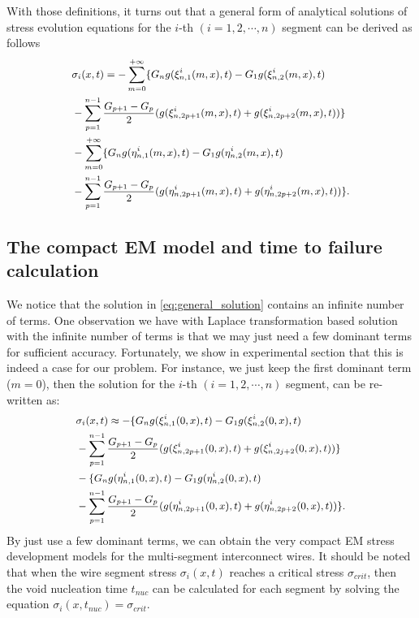 With those definitions, it turns out that a general form of analytical
solutions of stress evolution equations for the $i$-th
$(i=1,2,\cdots,n)$ segment can be derived as follows
\begin{equation} \label{eq:general_solution}\small
\begin{split}
&\sigma_{i}(x,t)=-\sum\limits_{m=0}^{+\infty}\{G_ng(\xi_{n,1}^{i}(m,x),t)-G_1g(\xi_{n,2}^{i}(m,x),t)\\
&-\sum\limits_{p=1}^{n-1}\frac{G_{p+1}-G_p}{2}(g(\xi_{n,2p+1}^{i}(m,x),t)+g(\xi_{n,2p+2}^{i}(m,x),t))\}\\
&-\sum\limits_{m=0}^{+\infty}\{G_ng(\eta_{n,1}^{i}(m,x),t)-G_1g(\eta_{n,2}^{i}(m,x),t)\\
&-\sum\limits_{p=1}^{n-1}\frac{G_{p+1}-G_p}{2}(g(\eta_{n,2p+1}^{i}(m,x),t)+g(\eta_{n,2p+2}^{i}(m,x),t))\}.
 \end{split}
 \end{equation}

\subsection{The compact EM model and time to failure calculation}
 We notice that the solution in \eqref{eq:general_solution} contains
 an infinite number of terms. One observation we have with Laplace
 transformation based solution with the infinite number of terms is that
 we may just need a few dominant terms for sufficient accuracy.
 Fortunately, we show in experimental section that this is indeed a
 case for our problem. For instance, we just keep the first dominant
 term ($m=0$), then the solution for the $i$-th $(i=1,2,\cdots,n)$
 segment, can be re-written as:
\begin{equation} \label{eq:approximate_solution}\small
\begin{split}
&\sigma_{i}(x,t)\approx-\{G_ng(\xi_{n,1}^{i}(0,x),t)-G_1g(\xi_{n,2}^{i}(0,x),t)\\
&-\sum\limits_{p=1}^{n-1}\frac{G_{p+1}-G_p}{2}(g(\xi_{n,2p+1}^{i}(0,x),t)+g(\xi_{n,2j+2}^{i}(0,x),t))\}\\
&-\{G_ng(\eta_{n,1}^{i}(0,x),t)-G_1g(\eta_{n,2}^{i}(0,x),t)\\
&-\sum\limits_{p=1}^{n-1}\frac{G_{p+1}-G_p}{2}(g(\eta_{n,2p+1}^{i}(0,x),t)+g(\eta_{n,2p+2}^{i}(0,x),t))\}.
 \end{split}
 \end{equation}
 By just use a few dominant terms, we can obtain the very compact EM
 stress development models for the multi-segment interconnect wires.
 It should be noted that when the wire segment stress
 $\sigma_{i}(x,t)$ reaches a critical stress $\sigma_{crit}$, then the
 void nucleation time $t_{nuc}$ can be calculated for each segment by
 solving the equation $\sigma_{i}(x,t_{nuc})=\sigma_{crit}$.

